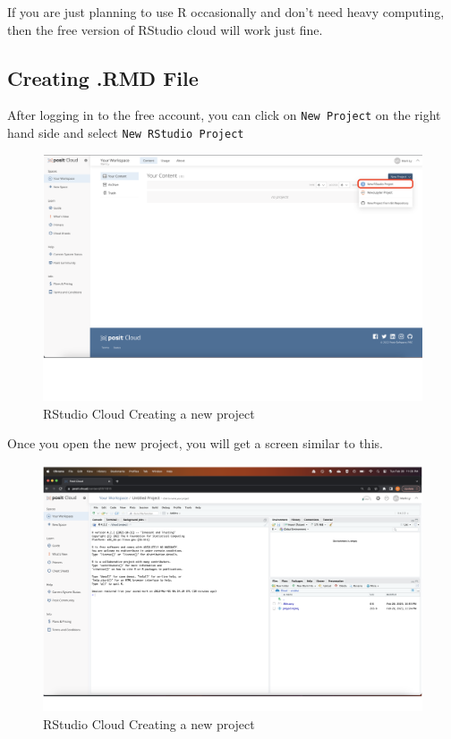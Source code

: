 \documentclass[
]{book}
\begin{document}
If you are just planning to use R occasionally and don't need heavy computing, then the free version of RStudio cloud will work just fine.

\hypertarget{creating-.rmd-file-1}{%
\subsection{Creating .RMD File}\label{creating-.rmd-file-1}}

After logging in to the free account, you can click on \texttt{New\ Project} on the right hand side and select \texttt{New\ RStudio\ Project}

\begin{figure}
\includegraphics[width=50in]{images/2.6rmarkdowncloud} \caption{RStudio Cloud Creating a new project}\label{fig:unnamed-chunk-7}
\end{figure}

Once you open the new project, you will get a screen similar to this.

\begin{figure}
\includegraphics[width=50in]{images/2.7rstudiocloud} \caption{RStudio Cloud Creating a new project}\label{fig:unnamed-chunk-8}
\end{figure}
\end{document}

